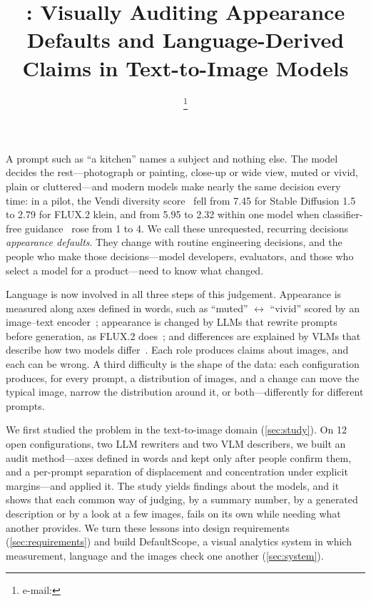 \documentclass[review]{vgtc}                 %
\title{\sysname{}: Visually Auditing Appearance Defaults and Language-Derived Claims in Text-to-Image Models}
\author{\pending{Author}\thanks{e-mail: \pending{email}}\\ %
        \scriptsize \pending{Affiliation}}
\newcommand{\sysname}{DefaultScope}
\begin{document}


\maketitle

A prompt such as ``a kitchen'' names a subject and nothing else. The model decides the rest---photograph or painting, close-up or wide view, muted or vivid, plain or cluttered---and modern models make nearly the same decision every time: in a pilot, the Vendi diversity score~\cite{vendi} fell from 7.45 for Stable Diffusion 1.5 to 2.79 for FLUX.2 klein, and from 5.95 to 2.32 within one model when classifier-free guidance~\cite{cfg} rose from 1 to 4. We call these unrequested, recurring decisions \emph{appearance defaults}. They change with routine engineering decisions, and the people who make those decisions---model developers, evaluators, and those who select a model for a product---need to know what changed.

Language is now involved in all three steps of this judgement. Appearance is measured along axes defined in words, such as ``muted'' $\leftrightarrow$ ``vivid'' scored by an image--text encoder~\cite{clip}; appearance is changed by LLMs that rewrite prompts before generation, as FLUX.2 does~\cite{flux2}; and differences are explained by VLMs that describe how two models differ~\cite{visdiff,compcon}. Each role produces claims about images, and each can be wrong. A third difficulty is the shape of the data: each configuration produces, for every prompt, a distribution of images, and a change can move the typical image, narrow the distribution around it, or both---differently for different prompts.

We first studied the problem in the text-to-image domain (\cref{sec:study}). On 12 open configurations, two LLM rewriters and two VLM describers, we built an audit method---axes defined in words and kept only after people confirm them, and a per-prompt separation of displacement and concentration under explicit margins---and applied it. The study yields findings about the models, and it shows that each common way of judging, by a summary number, by a generated description or by a look at a few images, fails on its own while needing what another provides. We turn these lessons into design requirements (\cref{sec:requirements}) and build \sysname{}, a visual analytics system in which measurement, language and the images check one another (\cref{sec:system}).
\end{document}
